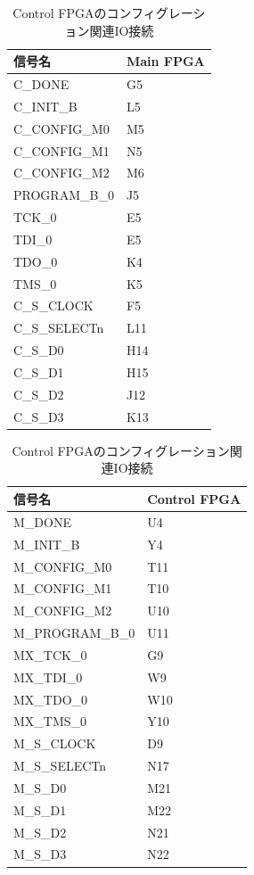 \documentclass[dvipdfmx]{jlreq}
\begin{document}
\begin{table}[htbp]
  \centering
  \begin{minipage}[t]{0.48\textwidth}
    \centering
    \caption{Main FPGAのコンフィグレーション関連IO接続}
    \label{tab:config_main}
    \begin{tabular}{|l|l|} \hline
       信号名 &  Main FPGA \\ \hline \hline
      C\_DONE & G5  \\
      C\_INIT\_B & L5  \\
      C\_CONFIG\_M0 & M5  \\
      C\_CONFIG\_M1 & N5  \\
      C\_CONFIG\_M2 & M6  \\
      PROGRAM\_B\_0 & J5  \\
      TCK\_0 & E5  \\
      TDI\_0 & E5  \\
      TDO\_0 & K4  \\
      TMS\_0 & K5  \\
      C\_S\_CLOCK & F5  \\
      C\_S\_SELECTn & L11  \\
      C\_S\_D0 & H14  \\
      C\_S\_D1 & H15  \\
      C\_S\_D2 & J12  \\
      C\_S\_D3 & K13  \\ \hline
    \end{tabular}
  \end{minipage}\hfill
  \begin{minipage}[t]{0.48\textwidth}
    \centering
    \caption{Control FPGAのコンフィグレーション関連IO接続}
    \label{tab:config_control}
    \begin{tabular}{|l|l|} \hline
       信号名 &  Control FPGA \\ \hline \hline
      M\_DONE & U4  \\
      M\_INIT\_B & Y4  \\
      M\_CONFIG\_M0 & T11  \\
      M\_CONFIG\_M1 & T10  \\
      M\_CONFIG\_M2 & U10  \\
      M\_PROGRAM\_B\_0 & U11  \\
      MX\_TCK\_0 & G9  \\
      MX\_TDI\_0 & W9  \\
      MX\_TDO\_0 & W10  \\
      MX\_TMS\_0 & Y10 \\
      M\_S\_CLOCK & D9  \\
      M\_S\_SELECTn & N17  \\
      M\_S\_D0 & M21  \\
      M\_S\_D1 & M22  \\
      M\_S\_D2 & N21  \\
      M\_S\_D3 & N22  \\ \hline
    \end{tabular}
  \end{minipage}
\end{table}
\end{document}
